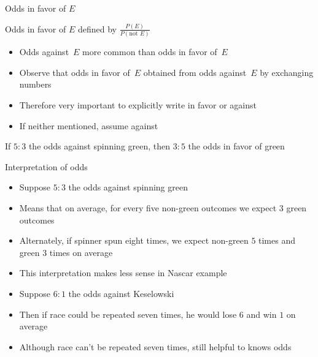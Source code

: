 \documentclass{beamer}
\theoremstyle{definition}
\begin{document}
\begin{frame}{Odds in favor of $E$}
\begin{definition}
\alert{Odds in favor of $E$} defined by
$\frac{P\left(E\right)}{P\left(\text{not $E$}\right)}$
\end{definition}
\begin{itemize}
\item Odds against~$E$ more common than odds in favor of~$E$
\item Observe that odds in favor of~$E$ obtained
from odds against~$E$ by exchanging numbers
\item Therefore very important to explicitly write
\alert{in favor} or \alert{against}
\item If neither mentioned, assume \alert{against}
\end{itemize}
\begin{example} If $5:3$ the odds against spinning green,
then $3:5$ the odds in favor of green
\end{example}
\end{frame}

\begin{frame}{Interpretation of odds} 
\begin{itemize}
\item Suppose $5:3$ the odds against spinning green
\item Means that on average, for every five non-green outcomes
we expect $3$ green outcomes
\item Alternately, if spinner spun eight times, we expect
non-green $5$ times and green $3$ times on average
\item This interpretation makes less sense in Nascar example
\item Suppose $6:1$ the odds against Keselowski
\item Then if race could be repeated seven times, he would
lose $6$ and win $1$ on average
\item Although race can't be repeated seven times,
still helpful to knows odds
\end{itemize}
\end{frame}

\end{document}

